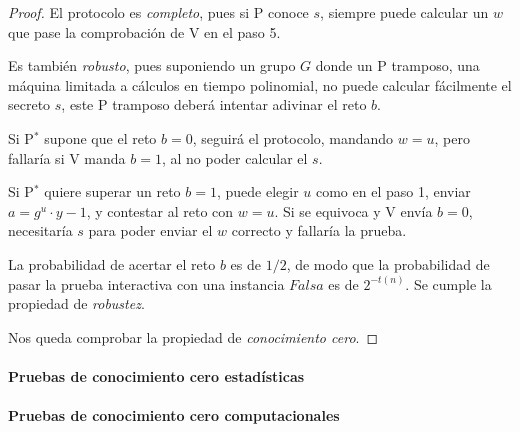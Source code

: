 \begin{proof}
	\hfil
	
	El protocolo es \textit{completo}, pues si P conoce $s$, siempre puede calcular un $w$ que pase la comprobación de V en el paso 5.
	
	\hfil
	
	Es también \textit{robusto}, pues suponiendo un grupo $G$ donde un P tramposo, una máquina limitada a cálculos en tiempo polinomial, no puede calcular fácilmente el secreto $s$, este P tramposo deberá intentar adivinar el reto $b$.
	
	Si P$^*$ supone que el reto $b=0$, seguirá el protocolo, mandando $w=u$, pero fallaría si V manda $b=1$, al no poder calcular el $s$.
	
	Si P$^*$ quiere superar un reto $b=1$, puede elegir $u$ como en el paso 1, enviar $a=g^u \cdot y-1$, y contestar al reto con $w=u$. Si se equivoca y V envía $b=0$, necesitaría $s$ para poder enviar el $w$ correcto y fallaría la prueba.
	
	La probabilidad de acertar el reto $b$ es de $1/2$, de modo que la probabilidad de pasar la prueba interactiva con una instancia $Falsa$ es de $2^{-t(n)}$. Se cumple la propiedad de \textit{robustez}.
	
	
	\hfil
	
	Nos queda comprobar la propiedad de \textit{conocimiento cero}.
	
	
	
	
	
	
	
\end{proof}

\paragraph{Pruebas de conocimiento cero estadísticas}



\paragraph{Pruebas de conocimiento cero computacionales}




